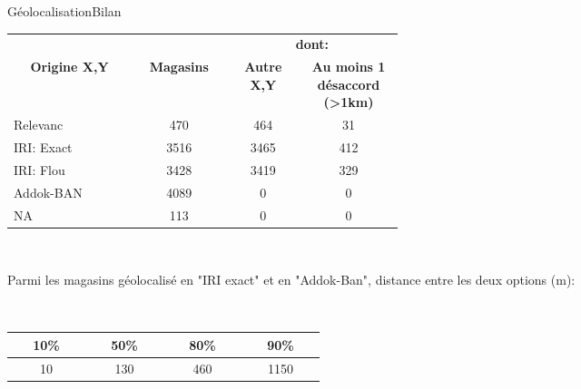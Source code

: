 \documentclass[ignorenonframetext,]{beamer}
\begin{document}
\begin{frame}{Géolocalisation}{Bilan}

\begin{footnotesize}
\begin{tabular}{p{0.2\linewidth}c{0.1\linewidth}c{0.1\linewidth}c{0.1\linewidth}}
\toprule
                 &  & \multicolumn{2}{c}{\textbf{dont:}} \\
                \multicolumn{1}{c}{\textbf{Origine X,Y}} & \multicolumn{1}{c}{\textbf{Magasins}}        &          \multicolumn{1}{c}{\textbf{Autre X,Y}} &          \multicolumn{1}{c}{\textbf{Au moins 1 désaccord (>1km)}} \\
\midrule
                 Relevanc  & 470           &      464 &  31\\
\rowcolor{LightCyan}
          IRI: Exact &  3516   &   3465 & 412  \\
           IRI: Flou&  3428      &         3419 &  329 \\
           \rowcolor{LightCyan}
Addok-BAN &  4089         &          0  &   0 & \\
NA & 113              &     0  &  0 \\
\bottomrule
\end{tabular}


\end{footnotesize}

\

Parmi les magasins géolocalisé en "IRI exact" et en "Addok-Ban", distance entre les deux options (m):

\

\begin{footnotesize}
\begin{tabular}{c{0.1\linewidth}c{0.1\linewidth}c{0.1\linewidth}c{0.1\linewidth}}
\toprule
                \multicolumn{1}{c}{\textbf{10\%}} & \multicolumn{1}{c}{\textbf{50\%}}        &          \multicolumn{1}{c}{\textbf{80\%}} &          \multicolumn{1}{c}{\textbf{90\%}} \\
\midrule
                 10 &  130 &  460 & 1150 \\
\bottomrule
\end{tabular}
\end{footnotesize}
    
\end{frame}
\end{document}
